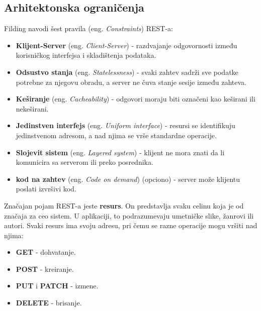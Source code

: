 \documentclass[12pt,oneside]{memoir}
\begin{document}
\subsection{Arhitektonska ograničenja}

Filding navodi šest pravila (eng. \textit{Constraints}) REST-a:

\begin{itemize}
  \item \textbf{Klijent-Server} (eng. \textit{Client-Server}) - razdvajanje odgovornosti između
  korisničkog interfejsa i skladištenja podataka.
  \item \textbf{Odsustvo stanja} (eng. \textit{Statelessness}) - svaki zahtev sadrži sve podatke potrebne za
  njegovu obradu, a server ne čuva stanje sesije između zahteva.
  \item \textbf{Keširanje} (eng. \textit{Cacheability}) - odgovori moraju biti označeni kao keširani ili
  nekeširani.
  \item \textbf{Jedinstven interfejs} (eng. \textit{Uniform interface}) - resursi se identifikuju
  jedinstvenom adresom, a nad njima se vrše standardne operacije.
  \item \textbf{Slojevit sistem} (eng. \textit{Layered system}) - klijent ne mora znati da li komunicira
  sa serverom ili preko posrednika.
  \item \textbf{kod na zahtev} (eng. \textit{Code on demand}) (opciono) - server može klijentu poslati
  izvršivi kod.
\end{itemize}

Značajan pojam REST-a jeste \textbf{resurs}. On predstavlja svaku celinu koja je od značaja za ceo sistem. 
U aplikaciji, to podrazumevaju umetničke slike, žanrovi ili autori. Svaki resurs ima svoju adresu, pri čemu se razne 
operacije mogu vršiti nad njima:
\begin{itemize}
  \item \textbf{GET} - dohvatanje.
  \item \textbf{POST} - kreiranje.
  \item \textbf{PUT} i \textbf{PATCH} - izmene.
  \item \textbf{DELETE} - brisanje.
\end{itemize}
  
\end{document}
